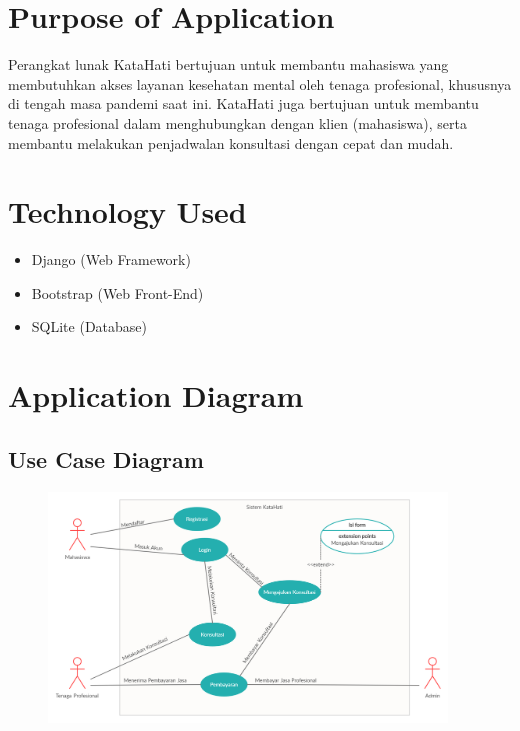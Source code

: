 \documentclass{article}
\begin{document}
	\section{Purpose of Application}
	\par Perangkat lunak KataHati bertujuan untuk membantu mahasiswa yang membutuhkan akses layanan kesehatan mental oleh tenaga profesional, khususnya di tengah masa pandemi saat ini. KataHati juga bertujuan untuk membantu tenaga profesional dalam menghubungkan dengan klien (mahasiswa), serta membantu melakukan penjadwalan konsultasi dengan cepat dan mudah.
	\section{Technology Used}
	\begin{itemize}
		\item Django (Web Framework)
		\item Bootstrap (Web Front-End)
		\item SQLite (Database)
	\end{itemize}
	
	\section{Application Diagram}

	\subsection{Use Case Diagram}
	\begin{figure}[H]
		\centering
		\includegraphics[width=400px]{Use Case Kata Hati.png}
	\end{figure}
\end{document}
